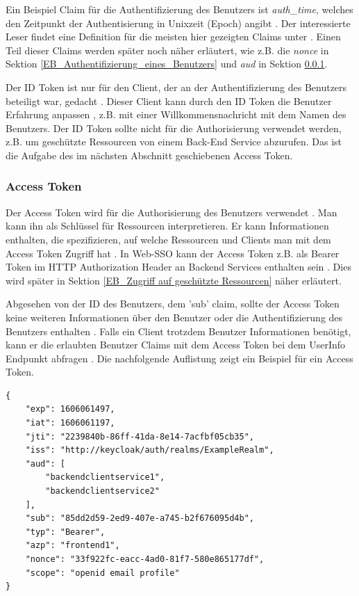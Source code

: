 Ein Beispiel Claim für die Authentifizierung des Benutzers ist \textit{auth\_time}, welches den Zeitpunkt der Authentisierung in Unixzeit (Epoch) angibt \cite{EB58}. Der interessierte Leser findet eine Definition für die meisten hier gezeigten Claims unter \cite{EB7}. Einen Teil dieser Claims werden später noch näher erläutert, wie z.B. die \textit{nonce} in Sektion \ref{EB_Authentifizierung_eines_Benutzers} und \textit{aud} in Sektion \ref{EB_AccessToken}.

Der ID Token ist nur für den Client, der an der Authentifizierung des Benutzers beteiligt war, gedacht \cite{EB59}. Dieser Client kann durch den ID Token die Benutzer Erfahrung anpassen \cite{EB8}, z.B. mit einer Willkommensnachricht mit dem Namen des Benutzers. Der ID Token sollte nicht für die Authorisierung verwendet werden, z.B. um geschützte Ressourcen von einem Back-End Service abzurufen. Das ist die Aufgabe des im nächsten Abschnitt geschiebenen Access Token.

\subsubsection{Access Token} \label{EB_AccessToken}

Der Access Token wird für die Authorisierung des Benutzers verwendet \cite{EB13}. Man kann ihn als Schlüssel für Ressourcen interpretieren. Er kann Informationen enthalten, die spezifizieren, auf welche Ressourcen und Clients man mit dem Access Token Zugriff hat \cite{EB30}. In Web-SSO kann der Access Token z.B. als Bearer Token im HTTP Authorization Header an Backend Services enthalten sein \cite{EB27}. Dies wird später in Sektion \ref{EB_Zugriff auf geschützte Ressourcen} näher erläutert.

Abgesehen von der ID des Benutzers, dem 'sub' claim, sollte der Access Token keine weiteren Informationen über den Benutzer oder die Authentifizierung des Benutzers enthalten \cite{EB7}. Falls ein Client trotzdem Benutzer Informationen benötigt, kann er die erlaubten Benutzer Claims mit dem Access Token bei dem UserInfo Endpunkt abfragen \cite{EB4}. Die nachfolgende Auflistung zeigt ein Beispiel für ein Access Token.

\begin{lstlisting}[caption=Beispiel Access Token, captionpos=b]
{
	"exp": 1606061497,
	"iat": 1606061197,
	"jti": "2239840b-86ff-41da-8e14-7acfbf05cb35",
	"iss": "http://keycloak/auth/realms/ExampleRealm",
	"aud": [
		"backendclientservice1",
		"backendclientservice2"
	],
	"sub": "85dd2d59-2ed9-407e-a745-b2f676095d4b",
	"typ": "Bearer",
	"azp": "frontend1",
	"nonce": "33f922fc-eacc-4ad0-81f7-580e865177df",
	"scope": "openid email profile"
}
\end{lstlisting}

